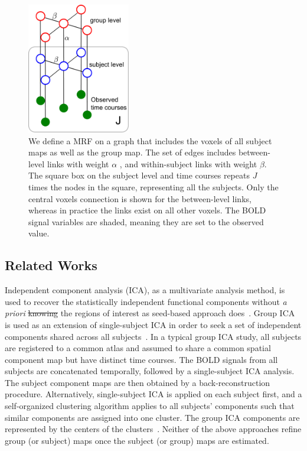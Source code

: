 \documentclass[review,authoryear]{elsarticle}
\providecommand{\DIFadd}[1]{{\protect\color{blue}\uwave{#1}}} %
\providecommand{\DIFdel}[1]{{\protect\color{red}\sout{#1}}}                      %
\providecommand{\DIFaddbegin}{} %
\providecommand{\DIFaddend}{} %
\providecommand{\DIFdelbegin}{} %
\providecommand{\DIFdelend}{} %
\begin{document}
\begin{figure}[htb]
  \centering
  \includegraphics[width=0.4\textwidth]{figures/graphical/grp2}
  \caption{We define a MRF on a graph that includes the voxels of all subject
    maps as well as the group map. The set of edges includes between-level links
    with weight $\alpha$ , and within-subject links with weight $\beta$. The
    square box on the subject level and time courses repeats $J$ times the nodes
    in the square, representing all the subjects. Only the central voxels
    connection is shown for the between-level links, whereas in practice the
    links exist on all other voxels. The BOLD signal variables are shaded,
    meaning they are set to the observed value.}
  \label{fig:graphical}
\end{figure}

\subsection{Related Works}
\label{sec:ref}
Independent component analysis (ICA), as a multivariate analysis method, is used
to recover the statistically independent functional components without \emph{a
  priori} \DIFdelbegin \DIFdel{knowing }\DIFdelend \DIFaddbegin \DIFadd{knowledge of }\DIFaddend the regions of interest as seed-based approach
does~\citep{hyvarinen2000independent}. Group ICA is used as an extension of
single-subject ICA in order to seek a set of independent components shared
across all subjects~\citep{calhoun2001spatial, beckmann2009group}. In a typical
group ICA study, all subjects are registered to a common atlas and assumed to
share a common spatial component map but have distinct time courses. The BOLD
signals from all subjects are concatenated temporally, followed by a
single-subject ICA analysis. The subject component maps are then obtained by a
back-reconstruction procedure. Alternatively, single-subject ICA is applied on
each subject first, and a self-organized clustering algorithm applies to all
subjects' components such that similar components are assigned into one
cluster. The group ICA components are represented by the centers of the
clusters~\citep{esposito2005independent}. Neither of the above approaches refine
group (or subject) maps once the subject (or group) maps are estimated.
\end{document}
